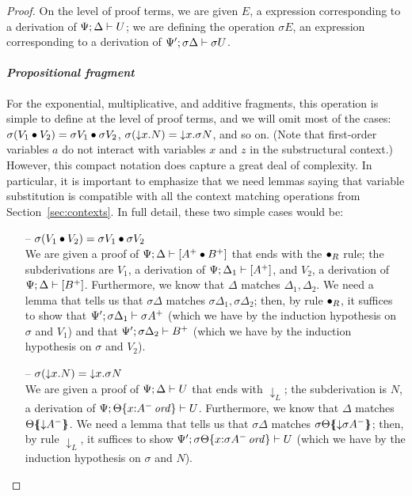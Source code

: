\begin{proof}
On the level of proof terms, 
we are given $E$, a expression corresponding to a derivation of
${\Psi};{\Delta} \vdash {U}$; we are defining the operation $\sigma{E}$,
an expression corresponding to a derivation of 
${\Psi'};{\sigma\Delta} \vdash {\sigma{U}}$.

\paragraph{\it Propositional fragment}
For the exponential, multiplicative, and additive fragments, this
operation is simple to define at the level of proof terms, and we will
omit most of the cases: $\sigma({V_1} \mathbin{\bullet} {V_2}) =
{\sigma{V_1}} \mathbin{\bullet} {\sigma{V_2}}$, $\sigma({\downarrow}{x}.{N}) =
{\downarrow}{x}.{\sigma N}$, and so on. (Note that first-order variables
$a$ do not interact with variables $x$ and $z$ in the substructural
context.) However, this compact notation does
capture a great deal of complexity. In particular, it is important to
emphasize that we need lemmas saying that variable substitution is
compatible with all the context matching operations from
Section~\ref{sec:contexts}.  In full detail, these two simple cases
would be:

\begin{itemize}

\item[--]
$\sigma({V_1} \mathbin{\bullet} {V_2}) = {\sigma{V_1}} \mathbin{\bullet} {\sigma{V_2}}$\smallskip\\
We are given a proof of ${\Psi};{\Delta} \vdash {[A^+ \mathbin{\bullet}B^+]}$ that
ends with the ${\mathbin{\bullet}}_R$ rule; the subderivations are
$V_1$, a derivation of ${\Psi};{\Delta_1} \vdash {[A^+]}$, and
$V_2$, a derivation of ${\Psi};{\Delta} \vdash {[B^+]}$. Furthermore, we know that
$\Delta$ matches $\Delta_1, \Delta_2$. We need a lemma that
tells us that $\sigma\Delta$ matches $\sigma\Delta_1, \sigma\Delta_2$;
then, by rule ${\mathbin{\bullet}}_R$, it suffices to show that
${\Psi'};{\sigma\Delta_1} \vdash {\sigma{A^+}}$ (which we have by the 
induction hypothesis on $\sigma$ and $V_1$) and that
${\Psi'};{\sigma\Delta_2} \vdash {B^+}$ (which we have by the induction hypothesis
on $\sigma$ and $V_2$). \smallskip

\item[--]
$\sigma({\downarrow}{x}.{N}) = {\downarrow}{x}.{\sigma N}$ \smallskip\\ 
We are given a proof
of ${\Psi};{\Delta} \vdash {U}$ that ends with ${\downarrow}_L$; 
the subderivation is $N$, a derivation of
${\Psi};{{\Theta}\{{x{:}{A^-}\,{{\it ord}}}\}} \vdash {U}$. Furthermore, we know that
$\Delta$ matches ${\Theta}\mbox{$\{\hspace{-4pt}\{$}{{\downarrow}A^-}\mbox{$\}\hspace{-4pt}\}$}$. We need a lemma
that tells us that $\sigma\Delta$ matches
${\sigma\Theta}\mbox{$\{\hspace{-4pt}\{$}{{\downarrow}\sigma A^-}\mbox{$\}\hspace{-4pt}\}$}$; then, by 
rule ${\downarrow}_L$, it suffices to show 
${\Psi'};{{\sigma\Theta}\{{x{:}{\sigma{A^-}}\,{{\it ord}}}\}} \vdash {U}$ (which
we have by the induction hypothesis on $\sigma$ and $N$).


\end{itemize}
\end{proof}
